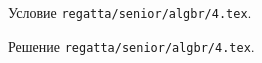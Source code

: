 Условие \texttt{regatta/senior/algbr/4.tex}.

\solution Решение \texttt{regatta/senior/algbr/4.tex}.
